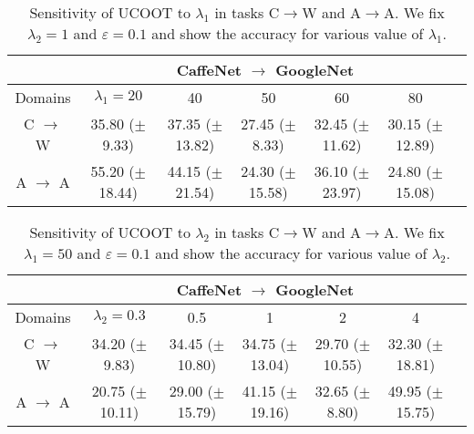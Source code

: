 \hfill
\begin{table}[H]
	\begin{center}
		\begin{footnotesize}
			\begin{sc}
				\begin{tabular}{c c c c c c c}
					\toprule
					& \multicolumn{5}{c}{CaffeNet $\to$ GoogleNet} \\
					\midrule
					Domains & $\lambda_1= 20$ & 40 & 50 & 60 & 80 \\
					\midrule
					C $\to$ W & 35.80 ($\pm$ 9.33) & 37.35 ($\pm$ 13.82) & 27.45 ($\pm$ 8.33) & 32.45 ($\pm$ 11.62) & 30.15 ($\pm$ 12.89) \\
					\hline
					A $\to$ A & 55.20 ($\pm$ 18.44) & 44.15 ($\pm$ 21.54) & 24.30 ($\pm$ 15.58) & 36.10 ($\pm$ 23.97) & 24.80 ($\pm$ 15.08) \\
					\hline
				\end{tabular}
			\end{sc}
		\end{footnotesize}
	\end{center}
	\caption{Sensitivity of UCOOT to $\lambda_1$ in tasks C$\to$W and A$\to$A.
  We fix $\lambda_2 = 1$ and $\varepsilon = 0.1$ and show the accuracy for various value of
  $\lambda_1$.} \label{tab:sensitiv_lambda1}
\end{table}

\hfill
\begin{table}[H]
	\begin{center}
		\begin{footnotesize}
			\begin{sc}
				\begin{tabular}{c c c c c c c}
					\toprule
					& \multicolumn{5}{c}{CaffeNet $\to$ GoogleNet} \\
					\midrule
					Domains & $\lambda_2= 0.3$ & 0.5 & 1 & 2 & 4 \\
					\midrule
					C $\to$ W & 34.20 ($\pm$ 9.83) & 34.45 ($\pm$ 10.80) & 34.75 ($\pm$ 13.04) & 29.70 ($\pm$ 10.55) & 32.30 ($\pm$ 18.81) \\
					\hline
					A $\to$ A & 20.75 ($\pm$ 10.11) & 29.00 ($\pm$ 15.79) & 41.15 ($\pm$ 19.16) & 32.65 ($\pm$ 8.80) & 49.95 ($\pm$ 15.75) \\
					\hline
				\end{tabular}
			\end{sc}
		\end{footnotesize}
	\end{center}
	\caption{Sensitivity of UCOOT to $\lambda_2$ in tasks C$\to$W and A$\to$A.
  We fix $\lambda_1 = 50$ and $\varepsilon = 0.1$ and show the accuracy for various value of
  $\lambda_2$.} \label{tab:sensitiv_lambda_2}
\end{table}

